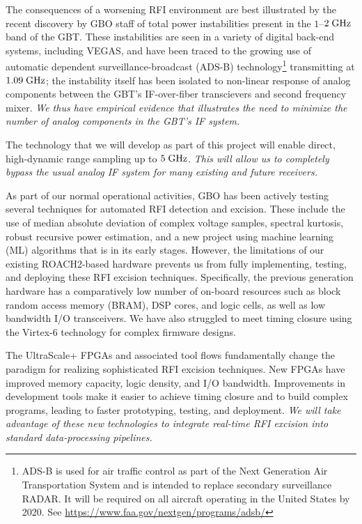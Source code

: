 \documentclass[10pt]{myNSF}
\begin{document}
The consequences of a worsening RFI environment are best illustrated
by the recent discovery by GBO staff of total power instabilities
present in the $1$--$2\; \textrm{GHz}$ band of the GBT.  These instabilities
are seen in a variety of digital back-end systems, including VEGAS,
and have been traced to the growing use of automatic dependent
surveillance-broadcast (ADS-B) technology\footnote{ADS-B is used for
  air traffic control as part of the Next Generation Air
  Transportation System and is intended to replace secondary
  surveillance RADAR.  It will be required on all aircraft operating
  in the United States by 2020.  See
  \url{https://www.faa.gov/nextgen/programs/adsb/}} transmitting at
$1.09\; \textrm{GHz}$; the instability itself has been isolated to non-linear
response of analog components between the GBT's IF-over-fiber
transcievers and second frequency mixer.  \emph{We thus have empirical
  evidence that illustrates the need to minimize the number of analog
  components in the GBT's IF system.}

The technology that we will develop as part of this project will
enable direct, high-dynamic range sampling up to $5\; \textrm{GHz}$.
\emph{This will allow us to completely bypass the usual analog IF
  system for many existing and future receivers.}

 As part of our normal operational
activities, GBO has been actively testing several techniques for
automated RFI detection and excision.  These include the use of median
absolute deviation of complex voltage samples, spectral kurtosis,
robust recursive power estimation, and a new project using machine
learning (ML) algorithms that is in its early stages.  However, the
limitations of our existing ROACH2-based hardware prevents us from
fully implementing, testing, and deploying these RFI excision
techniques.  Specifically, the previous generation hardware has a
comparatively low number of on-board resources such as block random
access memory (BRAM), DSP cores, and logic cells, as well as low
bandwidth I/O transceivers.  We have also struggled to meet timing
closure using the Virtex-6 technology for complex firmware designs.

The UltraScale+ FPGAs and associated tool flows fundamentally change
the paradigm for realizing sophisticated RFI excision techniques.  New
FPGAs have improved memory capacity, logic density, and I/O bandwidth.
Improvements in development tools make it easier to achieve timing
closure and to build complex programs, leading to faster prototyping,
testing, and deployment.  \emph{We will take advantage of these new
  technologies to integrate real-time RFI excision into standard
  data-processing pipelines.}
\end{document}
